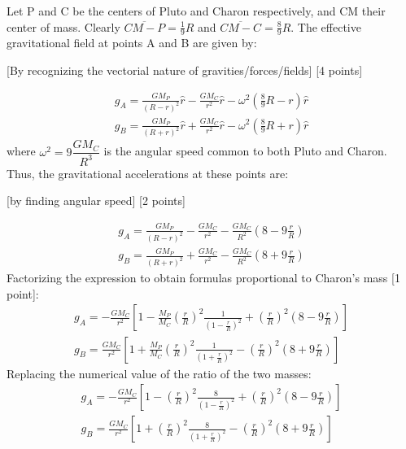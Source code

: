 Let P and C be the centers of Pluto and Charon respectively, and CM their
center of mass. Clearly $\overline{CM - P} = \frac{1}{9}R$ and
$\overline{CM - C} = \frac{8}{9}R$. The effective gravitational field at
points A and B are given by:
\begin{center}
[By recognizing the vectorial nature of gravities/forces/fields]
\hfill [4 points]
\end{center}
\begin{gather*}
g_A = \frac{GM_P}{(R-r)^2}\hat{r} - \frac{GM_C}{r^2}\hat{r}
  - \omega^2\left(\tfrac{8}{9}R - r\right)\hat{r} \tag*{[1 point]} \\
g_B = \frac{GM_P}{(R+r)^2}\hat{r} + \frac{GM_C}{r^2}\hat{r}
  - \omega^2\left(\tfrac{8}{9}R + r\right)\hat{r} \tag*{[1 point]}
\end{gather*}
where $\omega^2 = 9\dfrac{GM_C}{R^3}$ is the angular speed common to both
Pluto and Charon. Thus, the gravitational accelerations at these points are:
\begin{center}
[by finding angular speed] [2 points]
\end{center}
\begin{gather*}
g_A = \frac{GM_P}{(R-r)^2} - \frac{GM_C}{r^2}
  - \frac{GM_C}{R^2}\left(8 - 9\frac{r}{R}\right) \\
g_B = \frac{GM_P}{(R+r)^2} + \frac{GM_C}{r^2}
  - \frac{GM_C}{R^2}\left(8 + 9\frac{r}{R}\right)
\end{gather*}
Factorizing the expression to obtain formulas proportional to Charon's mass
[1 point]:
\begin{gather*}
g_A = -\frac{GM_C}{r^2}\left[1
  - \frac{M_P}{M_C}\left(\frac{r}{R}\right)^2
    \frac{1}{\left(1 - \frac{r}{R}\right)^2}
  + \left(\frac{r}{R}\right)^2\left(8 - 9\frac{r}{R}\right)\right] \\
g_B = \frac{GM_C}{r^2}\left[1
  + \frac{M_P}{M_C}\left(\frac{r}{R}\right)^2
    \frac{1}{\left(1 + \frac{r}{R}\right)^2}
  - \left(\frac{r}{R}\right)^2\left(8 + 9\frac{r}{R}\right)\right]
\end{gather*}
Replacing the numerical value of the ratio of the two masses:
\begin{gather*}
g_A = -\frac{GM_C}{r^2}\left[1
  - \left(\frac{r}{R}\right)^2\frac{8}{\left(1 - \frac{r}{R}\right)^2}
  + \left(\frac{r}{R}\right)^2\left(8 - 9\frac{r}{R}\right)\right] \\
g_B = \frac{GM_C}{r^2}\left[1
  + \left(\frac{r}{R}\right)^2\frac{8}{\left(1 + \frac{r}{R}\right)^2}
  - \left(\frac{r}{R}\right)^2\left(8 + 9\frac{r}{R}\right)\right]
\end{gather*}
